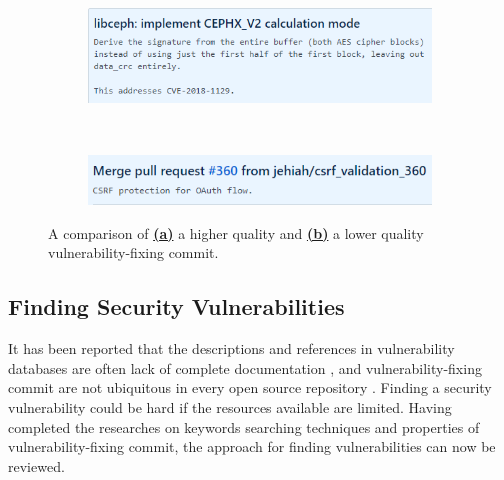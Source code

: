 \documentclass[12pt, a4paper]{report}
\begin{document}
\begin{figure}[H]
  \centering
  \begin{subfigure}{\textwidth}
    \centering
    \includegraphics{images/vuln_fixing_commit_good_ex.png}
  \end{subfigure} \\
  \begin{subfigure}{\textwidth}
    \centering
    \includegraphics[width=\textwidth]{images/vuln_fixing_commit_bad_ex.png}
  \end{subfigure}
  \caption[Examples of vulnerability-fixing commit]%
  {A comparison of \hyperref[figure:g_vfc]{\textbf{(a)}} a higher quality and
  \hyperref[figure:bad_vfc]{\textbf{(b)}} a lower quality vulnerability-fixing commit.}
  \label{figure:comparion_vfc}
\end{figure}

\subsection{Finding Security Vulnerabilities} \label{subsec:finding_vuln}
It has been reported that the descriptions and references in vulnerability databases are often lack
of complete documentation \cite{massacci_2010}, and vulnerability-fixing commit are not ubiquitous
in every open source repository \cite{walden_2014}. Finding a security vulnerability could be hard
if the resources available are limited. Having completed the researches on keywords searching
techniques and properties of vulnerability-fixing commit, the approach for finding vulnerabilities
can now be reviewed.
\end{document}
